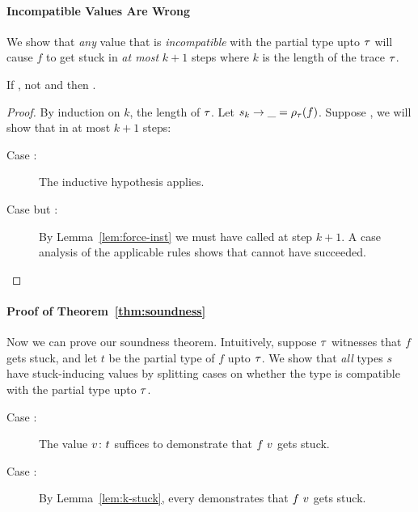 \paragraph{Incompatible Values Are Wrong}
%
We show that \emph{any} value that is \emph{incompatible} with
the partial type upto $\tau$ will cause $f$ to get stuck
in \emph{at most} $k+1$ steps where $k$ is the length of the
trace $\tau$.
%
\begin{lem}
\label{lem:k-stuck}
  If ,
     not  and
  then
     .
\end{lem}

\begin{proof}
  By induction on $k$, the length of $\tau$.
  Let ${s_k} \rightarrow \_ = \rho_{\tau}(f)$.
  Suppose , we
  will show that 
  in at most $k+1$ steps:
  \begin{description}
  \item[Case :]
    The inductive hypothesis applies.
  \item[Case  but :]
    By Lemma~\ref{lem:force-inst} we must have called \forcesym at step
    $k+1$.
    A case analysis of the applicable rules shows that \forcesym cannot
    have succeeded.
  \end{description}
\end{proof}

\paragraph{Proof of Theorem~\ref{thm:soundness}}
%
Now we can prove our soundness theorem. Intuitively, suppose $\tau$
witnesses that $f$ gets stuck, and let $t$ be the partial type of $f$
upto $\tau$. We show that \emph{all} types $s$ have stuck-inducing
values by splitting cases on whether the type is compatible with the
partial type upto $\tau$.
%
\begin{description}
  \item[Case :]
   The value ${v} \colon {t}$ suffices to demonstrate that $f \ v$
   gets stuck.
  \item[Case :]
   By Lemma~\ref{lem:k-stuck}, every  demonstrates that
   $f \ v$ gets stuck.
\end{description}


